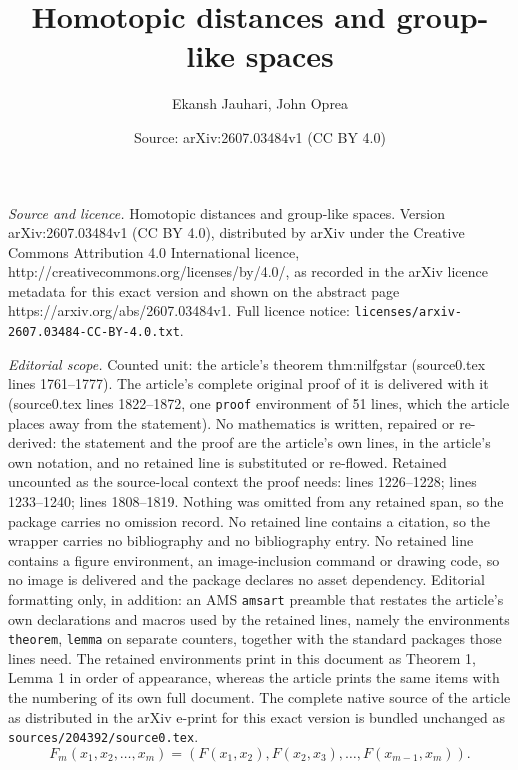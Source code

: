 \documentclass[10pt,a4paper]{amsart}
\title{Homotopic distances and group-like spaces}
\author{Ekansh Jauhari, John Oprea}
\date{Source: arXiv:2607.03484v1 (CC BY 4.0)}
\begin{document}
\maketitle

\noindent\emph{Source and licence.} Homotopic distances and group-like spaces. Version arXiv:2607.03484v1 (CC BY 4.0), distributed by arXiv under the Creative Commons Attribution 4.0 International licence, http://creativecommons.org/licenses/by/4.0/, as recorded in the arXiv licence metadata for this exact version and shown on the abstract page https://arxiv.org/abs/2607.03484v1. Full licence notice: \texttt{licenses/arxiv-2607.03484-CC-BY-4.0.txt}.\par\smallskip

\noindent\textit{Editorial scope.} Counted unit: the article's theorem thm:nilfgstar (source0.tex lines 1761--1777). The article's complete original proof of it is delivered with it (source0.tex lines 1822--1872, one \texttt{proof} environment of 51 lines, which the article places away from the statement). No mathematics is written, repaired or re-derived: the statement and the proof are the article's own lines, in the article's own notation, and no retained line is substituted or re-flowed.  Retained uncounted as the source-local context the proof needs: lines 1226--1228; lines 1233--1240; lines 1808--1819.  Nothing was omitted from any retained span, so the package carries no omission record.  No retained line contains a citation, so the wrapper carries no bibliography and no bibliography entry.  No retained line contains a figure environment, an image-inclusion command or drawing code, so no image is delivered and the package declares no asset dependency.  Editorial formatting only, in addition: an AMS \texttt{amsart} preamble that restates the article's own declarations and macros used by the retained lines, namely the environments \texttt{theorem}, \texttt{lemma} on separate counters, together with the standard packages those lines need.  The retained environments print in this document as Theorem 1, Lemma 1 in order of appearance, whereas the article prints the same items with the numbering of its own full document.  The complete native source of the article as distributed in the arXiv e-print for this exact version is bundled unchanged as \texttt{sources/204392/source0.tex}.
\begin{equation}\label{eq: map Fm}
F_m(x_1,x_2,\dots,x_m)=(F(x_1,x_2),F(x_2,x_3),\dots, F(x_{m-1},x_m)).
\end{equation}
\end{document}
